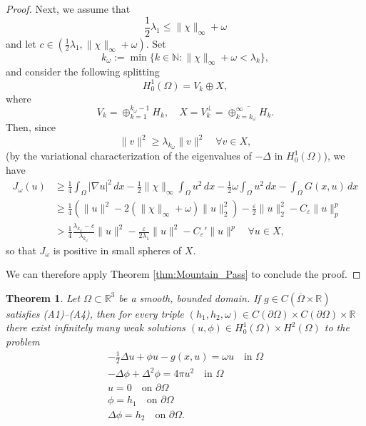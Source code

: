 \documentclass[10pt,a4paper]{amsart}
\numberwithin{equation}{section}
\newtheorem{theorem}[theo]{Theorem}
\begin{document}
\begin{proof}
Next, we assume that
\begin{equation}
 \label{eq:case_2_Dirichlet}
 \frac{1}{2} \lambda_1 \leq \|\chi\|_\infty + \omega
\end{equation}
and let $c \in \left(\frac{1}{2} \lambda_1, \|\chi\|_\infty + \omega \right)$. Set
\[
 k_\omega := \min\{k \in \mathbb N  :  \|\chi\|_\infty + \omega < \lambda_k\},
\]
and consider the following splitting 
\[
 H_0^1(\Omega) = V_k \oplus X,
\]
where
\[
 V_k = \oplus_{k = 1}^{k_\omega - 1} H_k, \quad 
 X = V_k^\perp = \overline{\oplus_{k = k_\omega}^\infty H_k}.
\]
Then, since
 \[
 \|v\|^2 \geq \lambda_{k_\omega} \|v\|^2 \quad \forall v \in X,
 \]
(by the variational characterization of the eigenvalues of $- \Delta$ in 
$H_0^1(\Omega)$), we have
\begin{align*}
 J_\omega(u)
& \geq \frac{1}{4} \int_\Omega |\nabla u|^2 \,dx 
 - \frac{1}{2} \|\chi\|_\infty \int_\Omega u^2 \,dx 
 - \frac{1}{2} \omega \int_\Omega u^2 \,dx - \int_\Omega G(x, u) \,dx  \\
& \geq \frac{1}{4}(\|u\|^2 - 2(\|\chi\|_\infty + \omega) \|u\|_2^2) 
 - \frac{\varepsilon}{2} \|u\|_2^2 - C_\varepsilon \|u\|_p^p  \\
& > \frac{1}{4} \frac{\lambda_{k_\omega} - c}{\lambda_{k_\omega}}\|u\|^2
 - \frac{\varepsilon}{2 \lambda_1} \|u\|^2 - C_\varepsilon' \|u\|^p \quad 
 \forall u \in X,
\end{align*}
so that $J_\omega$ is positive in small spheres of $X$.

We can therefore apply Theorem \ref{thm:Mountain_Pass} to conclude the proof.
\end{proof}

\begin{theorem}
 \label{thm:main_Dirichlet}
Let $\Omega \subset \mathbb R^3$ be a smooth, bounded domain. 
If $g \in C(\overline \Omega \times \mathbb R)$ satisfies {\rm (A1)--(A4)}, 
then for every triple $(h_1, h_2, \omega) \in C(\partial\Omega) \times C(\partial\Omega) \times \mathbb R$
there exist infinitely many weak solutions 
$(u, \phi) \in H_0^1(\Omega) \times H^2(\Omega)$ to the problem
 \begin{gather*}
 - \frac{1}{2} \Delta u + \phi u - g(x, u)  =  \omega u  \quad \text{in } \Omega \\
 - \Delta \phi + \Delta^2 \phi  =  4 \pi u^2  \quad \text{in } \Omega \\
 u  =  0  \quad \text{on } \partial\Omega \\
 \phi  =  h_1  \quad \text{on } \partial\Omega \\
 \Delta \phi  =  h_2  \quad \text{on } \partial\Omega.
 \end{gather*}
\end{theorem}
\end{document}
